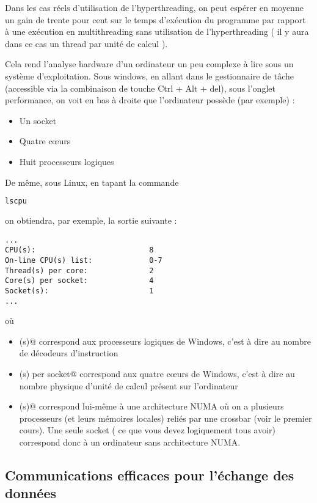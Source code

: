 \documentclass[fleqn,11pt]{article}
\begin{document}
Dans les cas réels d'utilisation de l'hyperthreading, on peut espérer en moyenne  un gain de trente pour cent sur le temps d'exécution du programme par rapport à une exécution en multithreading sans utilisation de
l'hyperthreading ( il y aura dans ce cas un thread par unité de calcul ).

Cela rend l'analyse hardware d'un ordinateur un peu complexe à lire sous un système d'exploitation.
Sous windows, en allant dans le gestionnaire de tâche (accessible via la combinaison de touche Ctrl + Alt + del), sous l'onglet performance, on voit en bas à droite que l'ordinateur possède (par exemple) :
\begin{itemize}
  \item Un socket
  \item Quatre c{\oe}urs
  \item Huit processeurs logiques
\end{itemize}

De même, sous Linux, en tapant la commande 
\begin{lstlisting}[language=sh]
 lscpu
\end{lstlisting}

on obtiendra, par exemple, la sortie suivante :

\begin{verbatim}
...
CPU(s):                          8
On-line CPU(s) list:             0-7
Thread(s) per core:              2
Core(s) per socket:              4
Socket(s):                       1
...
\end{verbatim}

où 
\begin{itemize}
  \item \verb@CPU(s)@ correspond aux processeurs logiques de Windows, c'est à dire au nombre de décodeurs d'instruction
  \item \verb@Core(s) per socket@ correspond aux quatre c{\oe}urs de Windows, c'est à dire au nombre physique d'unité de calcul présent sur l'ordinateur
  \item \verb@Socket(s)@ correspond lui-même à une architecture NUMA où on a plusieurs processeurs (et
  leurs mémoires locales) reliés par une crossbar (voir le premier cours). Une seule socket ( ce que vous
  devez logiquement tous avoir) correspond donc à un ordinateur sans architecture NUMA. 
\end{itemize}

\subsection{Communications efficaces pour l'échange des données}
\end{document}
